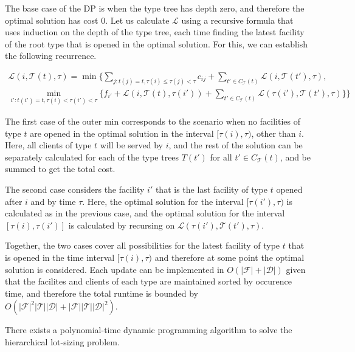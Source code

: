 The base case of the DP is when the type tree has depth zero, and therefore the optimal
solution has cost $0$. Let us calculate $\mathcal{L}$ using a recursive formula that uses
induction on the depth of the type tree, each time finding the latest facility of the root
type that is opened in the optimal solution. For this, we can establish the following
recurrence. %

\begin{align*}
\mathcal{L}(i, \mathcal{T}(t), \tau) = \min \Big\{
    \sum_{j: t(j)=t, \tau(i) \leq \tau(j) < \tau} c_{ij} + \sum_{t'\in C_\mathcal{T}(t)}  \mathcal{L}(i, \mathcal{T}(t'), \tau),\\
    \min_{i': t(i')=t, \tau(i) < \tau(i') < \tau} \{
        f_{i'}+\mathcal{L}(i, \mathcal{T}(t), \tau(i')) + \sum_{t'\in C_\mathcal{T}(t)} \mathcal{L}(\tau(i'), \mathcal{T}(t'), \tau)
    \}
\Big\}
\end{align*}

The first case of the outer min corresponds to the scenario when no facilities of type $t$ are opened in the optimal solution in the interval $[\tau(i),\tau)$, other than $i$. Here, all clients of type $t$ will be served by $i$, and the rest of the solution can be separately calculated for each of the type trees $T(t')$ for all $t'\in C_\mathcal{T}(t)$, and be summed to get the total cost.

The second case considers the facility $i'$ that is the last facility of type $t$ opened
after $i$ and by time $\tau$. Here, the optimal solution for the interval
$[\tau(i'),\tau)$ is calculated as in the previous case, and the optimal solution for the interval $[\tau(i),\tau(i')]$ is calculated by recursing on $\mathcal{L}(\tau(i'), \mathcal{T}(t'), \tau)$.

Together, the two cases cover all possibilities for the latest facility of type $t$ that is opened in the time interval $[\tau(i), \tau)$ and therefore at some point the optimal solution is considered. Each update can be implemented in $O(|\mathcal{F}|+|\mathcal{D}|)$ given that the facilites and clients of each type are maintained sorted by occurence time, and therefore the total runtime is bounded by $O(|\mathcal{F}|^2|\mathcal{T}||\mathcal{D}|+|\mathcal{F}||\mathcal{T}||\mathcal{D}|^2)$. %

\begin{thm}
There exists a polynomial-time dynamic programming algorithm
to solve the hierarchical lot-sizing problem.
\end{thm}



